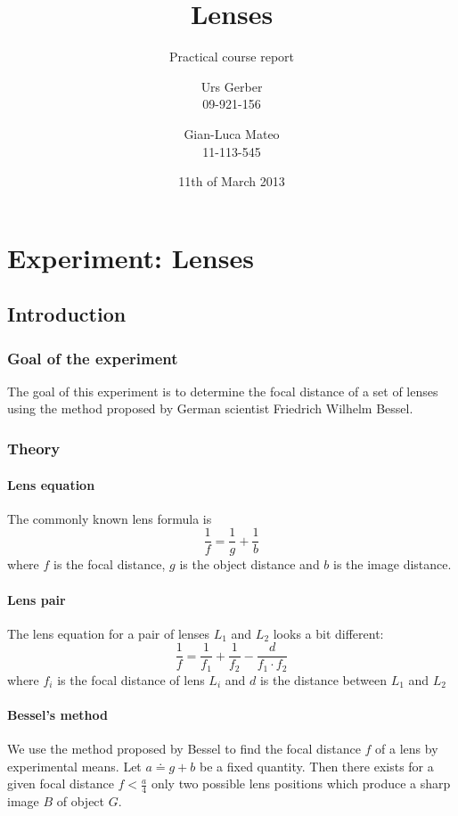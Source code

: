 \documentclass{scrreprt}
\author{Urs Gerber\\09-921-156 \and Gian-Luca Mateo\\11-113-545}
\date{11th of March 2013}
\title{Lenses}
\subtitle{Practical course report}
\begin{document}
\maketitle

\tableofcontents
\newpage

\chapter{Experiment: Lenses}

\section{Introduction}

\subsection{Goal of the experiment}
The goal of this experiment is to determine the focal distance of a set of lenses using the method proposed by German scientist Friedrich Wilhelm Bessel.

\subsection{Theory}

\subsubsection{Lens equation}
The commonly known lens formula is
\begin{equation}
\frac{1}{f} = \frac{1}{g} + \frac{1}{b}
\end{equation}
where $f$ is the focal distance, $g$ is the object distance and $b$ is the image distance.

\subsubsection{Lens pair}
The lens equation for a pair of lenses $L_1$ and $L_2$ looks a bit different:
\begin{equation}
\frac{1}{f}= \frac{1}{f_1} + \frac{1}{f_2} - \frac{d}{f_1 \cdot f_2}
\end{equation}
where $f_i$ is the focal distance of lens $L_i$ and $d$ is the distance between $L_1$ and $L_2$

\subsubsection{Bessel's method}
We use the method proposed by Bessel to find the focal distance $f$ of a lens by experimental means. Let $a \doteq g + b$ be a fixed quantity. Then there exists for a given focal distance $f < \frac{a}{4}$ only two possible lens positions which produce a sharp image $B$ of object $G$. 
\end{document}
